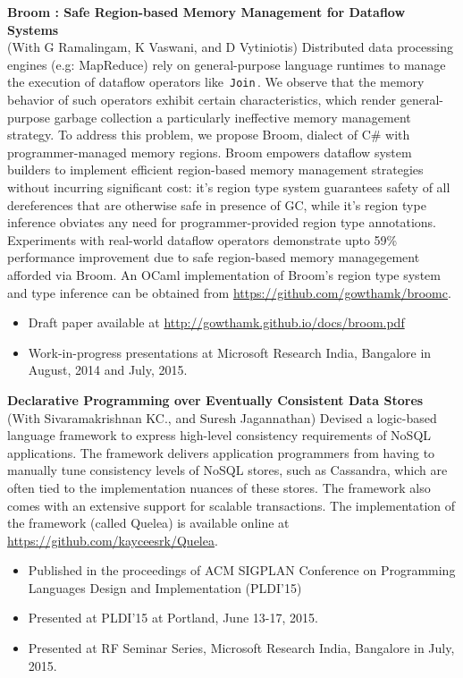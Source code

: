 \documentclass[margin,line]{res}
\newcommand{\code}[1]{\,{\tt #1}\,}
\newcommand{\C}[1]{\code{#1}}
\begin{document}
\begin{resume}
 {\bf Broom : Safe Region-based Memory Management for Dataflow
 Systems}\\ (With G Ramalingam, K Vaswani, and D Vytiniotis)
 Distributed data processing engines (e.g: MapReduce) rely on
 general-purpose language runtimes to manage the execution of dataflow
 operators like \C{Join}. We observe that the memory behavior of such
 operators exhibit certain characteristics, which render
 general-purpose garbage collection a particularly ineffective memory
 management strategy. To address this problem, we propose {\sc Broom},
 dialect of C\# with programmer-managed memory regions. 
 {\sc Broom} empowers dataflow system builders to implement efficient
 region-based memory management strategies without incurring
 significant cost: it's region type system guarantees safety of all
 dereferences that are otherwise safe in presence of GC, while it's
 region type inference obviates any need for programmer-provided
 region type annotations. Experiments with real-world dataflow
 operators demonstrate upto 59\% performance improvement due to safe
 region-based memory managegement afforded via {\sc Broom}. An OCaml
 implementation of {\sc Broom}'s region type system and type inference
 can be obtained from \url{https://github.com/gowthamk/broomc}.
 \begin{itemize}
 \item Draft paper available at
 \url{http://gowthamk.github.io/docs/broom.pdf}
 \item Work-in-progress presentations at Microsoft Research India,
 Bangalore in August, 2014 and July, 2015. 
 \end{itemize}

 {\bf Declarative Programming over Eventually Consistent Data Stores} \\
 (With Sivaramakrishnan KC., and Suresh Jagannathan) Devised a
 logic-based language framework to express high-level consistency
 requirements of NoSQL applications. The framework delivers
 application programmers from having to manually tune consistency
 levels of NoSQL stores, such as Cassandra, which are often tied to
 the implementation nuances of these stores. The framework also comes
 with an extensive support for scalable transactions. The
 implementation of the framework (called {\sc Quelea}) is available
 online at \url{https://github.com/kayceesrk/Quelea}.
 \begin{itemize}
 \item Published in the proceedings of ACM SIGPLAN Conference on
 Programming Languages Design and Implementation (PLDI'15)
 \item Presented at PLDI'15 at Portland, June 13-17, 2015.
 \item Presented at RF Seminar Series, Microsoft Research India,
 Bangalore in July, 2015.  
 \end{itemize}



\end{resume}
\end{document}
